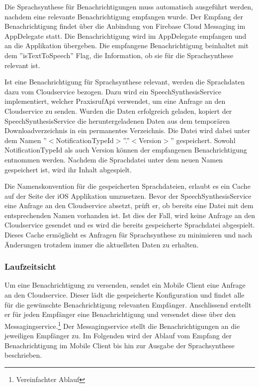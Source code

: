 Die Sprachsynthese für Benachrichtigungen muss automatisch ausgeführt werden, nachdem eine relevante Benachrichtigung empfangen wurde.
Der Empfang der Benachrichtigung findet über die Anbindung von Firebase Cloud Messaging im AppDelegate statt.
Die Benachrichtigung wird im AppDelegate empfangen und an die Applikation übergeben.
Die empfangene Benachrichtigung beinhaltet mit dem ''isTextToSpeech'' Flag, die Information, ob sie für die Sprachsynthese relevant ist.

Ist eine Benachrichtigung für Sprachsynthese relevant, werden die Sprachdaten dazu vom Cloudservice bezogen.
Dazu wird ein SpeechSynthesisService implementiert, welcher PraxisrufApi verwendet, um eine Anfrage an den Cloudservice zu senden.
Wurden die Daten erfolgreich geladen, kopiert der SpeechSynthesisService die heruntergeladenen Daten aus dem temporären Downloadverzeichnis in ein permanentes Verzeichnis.
Die Datei wird dabei unter dem Namen ''$<$NotificationTypeId$>$''.''$<$Version$>$'' gespeichert.
Sowohl NotificationTypeId als auch Version können der empfangenen Benachrichtigung entnommen werden.
Nachdem die Sprachdatei unter dem neuen Namen gespeichert ist, wird ihr Inhalt abgespielt.

Die Namenskonvention für die gespeicherten Sprachdateien, erlaubt es ein Cache auf der Seite der iOS Applikation umzusetzen.
Bevor der SpeechSynthesisService eine Anfrage an den Cloudservice absetzt, prüft er, ob bereits eine Datei mit dem entsprechenden Namen vorhanden ist.
Ist dies der Fall, wird keine Anfrage an den Cloudservice gesendet und es wird die bereits gespeicherte Sprachdatei abgespielt.
Dieses Cache ermöglicht es Anfragen für Sprachsynthese zu minimieren und nach Änderungen trotzdem immer die aktuellsten Daten zu erhalten.

\clearpage
\subsubsection{Laufzeitsicht}

Um eine Benachrichtigung zu versenden, sendet ein Mobile Client eine Anfrage an den Cloudservice.
Dieser lädt die gespeicherte Konfiguration und findet alle für die gewünschte Benachrichtigung relevanten Empfänger.
Anschlissend erstellt er für jeden Empfänger eine Benachrichtigung und versendet diese über den Messagingservice.\cite{ip5}\footnote{Vereinfachter Ablauf}
Der Messagingservice stellt die Benachrichtigungen an die jeweiligen Empfänger zu.
Im Folgenden wird der Ablauf vom Empfang der Benachrichtigung im Mobile Client bis hin zur Ausgabe der Sprachsynthese beschrieben.

